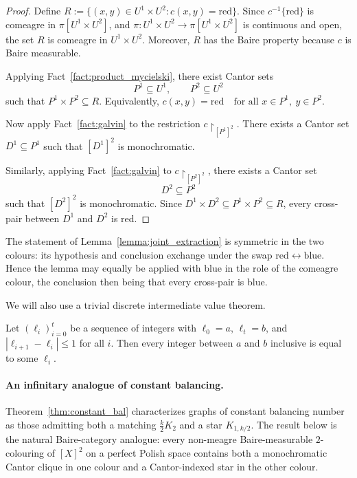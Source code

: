 \begin{proof}
    Define $R:=\{(x,y)\in U^1\times U^2:c(x,y)=\mathrm{red}\}$.
    Since $c^{-1}\{\mathrm{red}\}$ is comeagre in $\pi[U^1\times U^2]$, and $\pi\colon U^1\times U^2\to \pi[U^1\times U^2]$ is continuous and open, the set $R$ is comeagre in $U^1\times U^2$.
    Moreover, $R$ has the Baire property because $c$ is Baire measurable.
    
    Applying Fact~\ref{fact:product_mycielski}, there exist Cantor sets $$P^1\subseteq U^1,\qquad P^2\subseteq U^2$$ such that $P^1\times P^2\subseteq R$.
    Equivalently, $c(x,y)=\mathrm{red}\quad\text{for all } x\in P^1,\ y\in P^2$.
    
    Now apply Fact~\ref{fact:galvin} to the restriction $c\restriction_{[P^1]^2}$.
    There exists a Cantor set $D^1\subseteq P^1$ such that $[D^1]^2$ is monochromatic.
    
    Similarly, applying Fact~\ref{fact:galvin} to $c\restriction_{[P^2]^2}$, there exists a Cantor set $$D^2\subseteq P^2$$ such that $[D^2]^2$ is monochromatic.
    Since $D^1\times D^2\subseteq P^1\times P^2\subseteq R$, every cross-pair between $D^1$ and $D^2$ is red.
\end{proof}
 
\begin{remark}\label{rmk:joint_extraction_symmetric}
    The statement of Lemma~\ref{lemma:joint_extraction} is symmetric in the two colours: its hypothesis and conclusion exchange under the swap $\mathrm{red}\leftrightarrow\mathrm{blue}$.
    Hence the lemma may equally be applied with blue in the role of the comeagre colour, the conclusion then being that every cross-pair is blue.
\end{remark}
 
We will also use a trivial discrete intermediate value theorem.
 
\begin{lemma}\label{lemma:discrete_ivt}
    Let $(\ell_i)_{i=0}^t$ be a sequence of integers with $\ell_0=a$, $\ell_t=b$, and $|\ell_{i+1}-\ell_i|\leq 1$ for all $i$.
    Then every integer between $a$ and $b$ inclusive is equal to some $\ell_i$.
\end{lemma}
 
\paragraph{An infinitary analogue of constant balancing.}
 
Theorem~\ref{thm:constant_bal} characterizes graphs of constant balancing number as those admitting both a matching $\frac{k}{2}K_2$ and a star $K_{1,k/2}$.
The result below is the natural Baire-category analogue: every non-meagre Baire-measurable $2$-colouring of $[X]^2$ on a perfect Polish space contains both a monochromatic Cantor clique in one colour and a Cantor-indexed star in the other colour.
 
